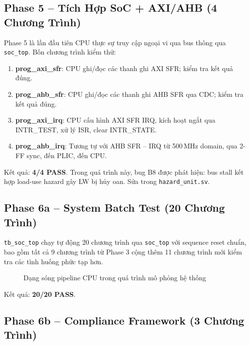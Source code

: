 \subsection{Phase 5 -- Tích Hợp SoC + AXI/AHB (4 Chương Trình)}

Phase 5 là lần đầu tiên CPU thực sự truy cập ngoại vi qua bus thông qua \texttt{soc\_top}. Bốn chương trình kiểm thử:

\begin{enumerate}
    \item \textbf{prog\_axi\_sfr}: CPU ghi/đọc các thanh ghi AXI SFR; kiểm tra kết quả đúng.
    \item \textbf{prog\_ahb\_sfr}: CPU ghi/đọc các thanh ghi AHB SFR qua CDC; kiểm tra kết quả đúng.
    \item \textbf{prog\_axi\_irq}: CPU cấu hình AXI SFR IRQ, kích hoạt ngắt qua INTR\_TEST, xử lý ISR, clear INTR\_STATE.
    \item \textbf{prog\_ahb\_irq}: Tương tự với AHB SFR -- IRQ từ 500\,MHz domain, qua 2-FF sync, đến PLIC, đến CPU.
\end{enumerate}

Kết quả: \textbf{4/4 PASS}. Trong quá trình này, bug B8 được phát hiện: bus stall kết hợp load-use hazard gây LW bị hủy oan. Sửa trong \texttt{hazard\_unit.sv}.

\subsection{Phase 6a -- System Batch Test (20 Chương Trình)}

\texttt{tb\_soc\_top} chạy tự động 20 chương trình qua \texttt{soc\_top} với sequence reset chuẩn, bao gồm tất cả 9 chương trình từ Phase 3 cộng thêm 11 chương trình mới kiểm tra các tình huống phức tạp hơn.

\begin{figure}[htp]
\centering
{}
\caption{Dạng sóng pipeline CPU trong quá trình mô phỏng hệ thống}
\label{fig:pipeline-waveform}
\end{figure}

Kết quả: \textbf{20/20 PASS}.

\subsection{Phase 6b -- Compliance Framework (3 Chương Trình)}

